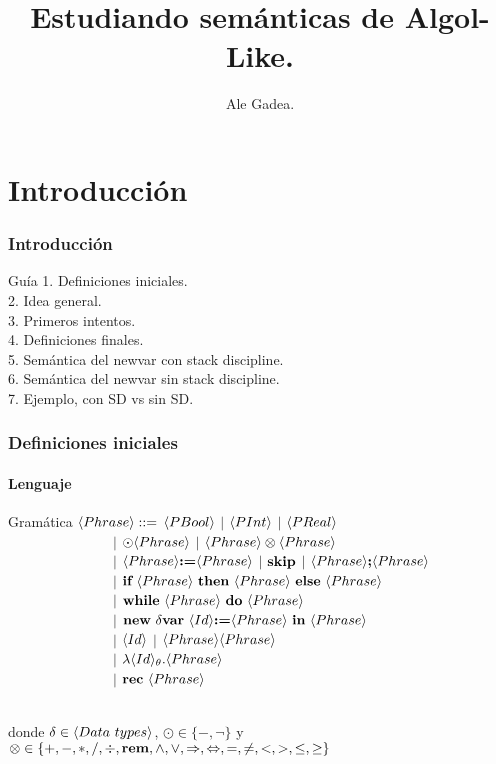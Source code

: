\documentclass{beamer} %
\begin{document}
\title{Estudiando sem\'anticas de Algol-Like.}
\author{{Ale Gadea.}\\
\vspace*{0.5cm}}
\frame{\titlepage}

\section{Introducci\'on}

\begin{frame}
\frametitle{Introducci\'on}
\begin{block}{Gu\'ia}
1. Definiciones iniciales.\\
2. Idea general.\\
3. Primeros intentos.\\
4. Definiciones finales.\\
5. Sem\'antica del newvar con stack discipline.\\
6. Sem\'antica del newvar sin stack discipline.\\
7. Ejemplo, con SD vs sin SD.
\end{block}
\end{frame}

\begin{frame}
\frametitle{Definiciones iniciales}
\framesubtitle{Lenguaje}

\begin{block}{Gram\'atica}
$\langle Phrase \rangle ::=$ $\langle PBool \rangle$ $|$ $\langle PInt \rangle$ $|$ $\langle PReal \rangle$ \\
\ \ \ \ \ \ \ \ \ \ \ \ \ \ \ $|$ 
$\odot \langle Phrase \rangle$ $|$ $\langle Phrase \rangle \otimes \langle Phrase \rangle $ \\ 
\ \ \ \ \ \ \ \ \ \ \ \ \ \ \ $|$ 
$\langle Phrase \rangle \textbf{:=} \langle Phrase \rangle$ $|$ $\textbf{skip}$ $|$ $\langle Phrase \rangle \textbf{;} \langle Phrase \rangle$ \\ 
\ \ \ \ \ \ \ \ \ \ \ \ \ \ \ $|$ 
$\textbf{if} \ \langle Phrase \rangle \ \textbf{then} \ \langle Phrase \rangle \ \textbf{else} \ \langle Phrase \rangle$ \\ 
\ \ \ \ \ \ \ \ \ \ \ \ \ \ \ $|$ 
$\textbf{while} \ \langle Phrase \rangle \ \textbf{do} \ \langle Phrase \rangle$ \\ 
\ \ \ \ \ \ \ \ \ \ \ \ \ \ \ $|$ 
$\textbf{new} \ \delta \textbf{var} \ \langle Id \rangle \textbf{:=} \langle Phrase \rangle \ \textbf{in} \ \langle Phrase \rangle$ \\ 
\ \ \ \ \ \ \ \ \ \ \ \ \ \ \ $|$ 
$\langle Id \rangle$ $|$ $\langle Phrase \rangle\langle Phrase \rangle$ \\
\ \ \ \ \ \ \ \ \ \ \ \ \ \ \ $|$ 
$\lambda \langle Id \rangle_{\theta} . \langle Phrase \rangle $ \\
\ \ \ \ \ \ \ \ \ \ \ \ \ \ \ $|$ 
$\textbf{rec} \ \langle Phrase \rangle$\\
\

donde $\delta \in \lrangles{Data \ types}$, $\odot \in \{-, \neg\}$ y 
$\otimes \in \{+,-,*,/,\div,\textbf{rem},\wedge,\vee,\Rightarrow,\Leftrightarrow, =,\neq,<,>,\leq,\geq\}$\\
\end{block}

\end{frame}
\end{document}
